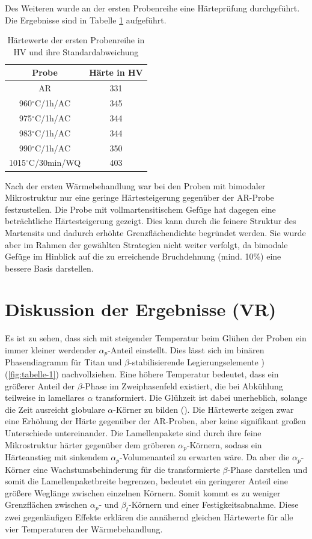 Des Weiteren wurde an der ersten Probenreihe eine Härteprüfung durchgeführt. Die Ergebnisse sind in Tabelle \ref{Tabelle 5} aufgeführt. 

\begin{table}
	\centering
	\begin{tabular}{|c|c|}
		\hline 
		Probe & Härte in HV \\ 
		\hline 
		AR & 331 \\ 
		\hline 
		960$^\circ$C/1h/AC & 345 \\ 
		\hline 
		975$^\circ$C/1h/AC & 344 \\ 
		\hline 
		983$^\circ$C/1h/AC & 344 \\ 
		\hline 
		990$^\circ$C/1h/AC & 350 \\ 
		\hline 
		1015$^\circ$C/30min/WQ & 403 \\ 
		\hline 
	\end{tabular} 
	\caption{Härtewerte der ersten Probenreihe in HV und ihre Standardabweichung}
	\label{Tabelle 5}
\end{table}

Nach der ersten Wärmebehandlung war bei den Proben mit bimodaler Mikrostruktur nur eine geringe Härtesteigerung gegenüber der AR-Probe festzustellen. 
Die Probe mit vollmartensitischem Gefüge hat dagegen eine beträchtliche Härtesteigerung gezeigt. Dies kann durch die feinere Struktur des Martensits und dadurch erhöhte Grenzflächendichte begründet werden. Sie wurde aber im Rahmen der gewählten Strategien nicht weiter verfolgt, da bimodale Gefüge im Hinblick auf die zu erreichende Bruchdehnung (mind. 10\%) eine bessere Basis darstellen.


\section{Diskussion der Ergebnisse (VR)}

Es ist zu sehen, dass sich mit steigender Temperatur beim Glühen der Proben ein immer kleiner werdender $\alpha_p$-Anteil einstellt. Dies lässt sich im binären Phasendiagramm für Titan und $\beta$-stabilisierende Legierungselemente )(\ref{fig:tabelle-1}) nachvollziehen. Eine höhere Temperatur bedeutet, dass ein größerer Anteil der $\beta$-Phase im Zweiphasenfeld existiert, die bei Abkühlung teilweise in lamellares $\alpha$ transformiert. Die Glühzeit ist dabei unerheblich, solange die Zeit ausreicht globulare $\alpha$-Körner zu bilden (\cite{G.LutjeringJ.C.WilliamsA.Gysler.}). 
Die Härtewerte zeigen zwar eine Erhöhung der Härte gegenüber der AR-Proben, aber keine signifikant großen Unterschiede untereinander. Die Lamellenpakete sind durch ihre feine Mikrostruktur härter gegenüber dem gröberen $\alpha_p$-Körnern, sodass ein Härteanstieg mit sinkendem $\alpha_p$-Volumenanteil zu erwarten wäre. Da aber die $\alpha_p$-Körner eine Wachstumsbehinderung für die transformierte $\beta$-Phase darstellen und somit die Lamellenpaketbreite begrenzen, bedeutet ein geringerer Anteil eine größere Weglänge zwischen einzelnen Körnern. Somit kommt es zu weniger Grenzflächen zwischen $\alpha_p$- und $\beta_t$-Körnern und einer Festigkeitsabnahme. Diese zwei gegenläufigen Effekte erklären die annähernd gleichen Härtewerte für alle vier Temperaturen der Wärmebehandlung. 